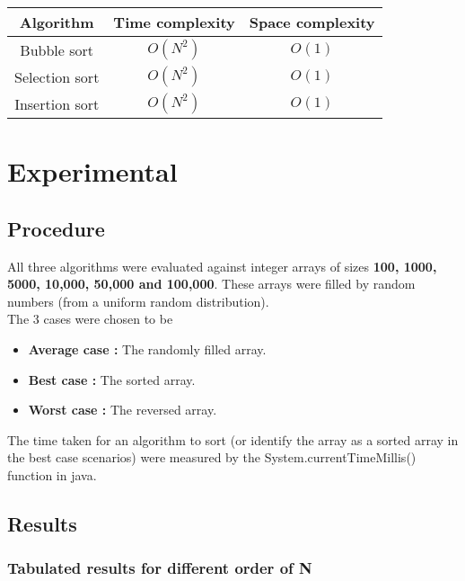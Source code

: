\documentclass[11pt]{article}
\begin{document}
\begin{tabular}{|c|c|c|}
\hline
Algorithm & Time complexity & Space complexity\\
\hline
Bubble sort		&	$ O(N^2) $	&	$O(1)$		\\
Selection sort	&	$O(N^2)$	&	$O(1)$		\\
Insertion sort	&	$O(N^2)$	&	$O(1)$		\\
\hline
\end{tabular}


\section{Experimental}

\subsection{Procedure}

All three algorithms were evaluated against integer arrays of sizes \textbf{100, 1000, 5000, 10,000, 50,000 and 100,000}.
These arrays were filled by random numbers (from a uniform random distribution).
\\The 3 cases were chosen to be
\begin{itemize}
\item \textbf{Average case : }The randomly filled array.
\item \textbf{Best case : }The sorted array.
\item \textbf{Worst case : }The reversed array.
\end{itemize}


The time taken for an algorithm to sort (or identify the array as a sorted array in the best case scenarios) were measured by the System.currentTimeMillis() function in java.

\subsection{Results}
\subsubsection{Tabulated results for different order of N}
\end{document}
